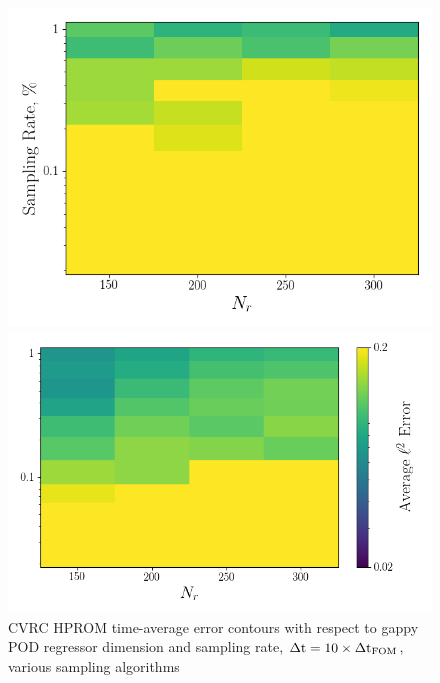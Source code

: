 \begin{figure}
	\begin{minipage}{0.46\linewidth}
		\includegraphics[width=0.99\linewidth]{Chapters/HPROMResults/Images/cvrc/deim/err_contour_gnat1_dt1e-6.png}
	\end{minipage}
	\begin{minipage}{0.53\linewidth}
		\includegraphics[width=0.99\linewidth]{Chapters/HPROMResults/Images/cvrc/deim/err_contour_gnat2_dt1e-6.png}
	\end{minipage}
	\caption{CVRC HPROM time-average error contours with respect to gappy POD regressor dimension and sampling rate, $\Delta \text{t} = 10 \times \Delta \text{t}_{\text{FOM}}$, various sampling algorithms}
\end{figure}


